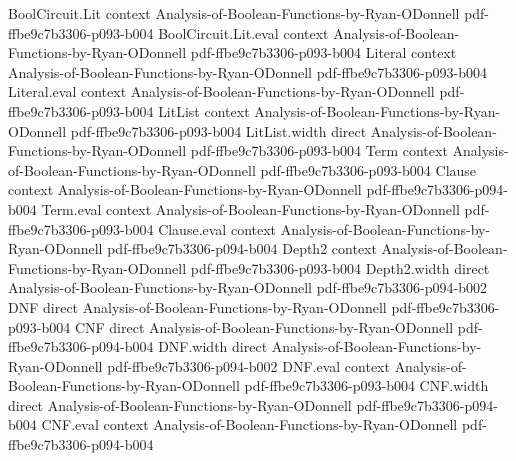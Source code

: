 \begin{lemma}
\label{BoolBLR.BLR_completeness}
\leanok
{}
\proofstep
  {BoolCircuit.Lit}
  {context}
  {Analysis-of-Boolean-Functions-by-Ryan-ODonnell}
  {pdf-ffbe9c7b3306-p093-b004}
\proofstep
  {BoolCircuit.Lit.eval}
  {context}
  {Analysis-of-Boolean-Functions-by-Ryan-ODonnell}
  {pdf-ffbe9c7b3306-p093-b004}
\proofstep
  {Literal}
  {context}
  {Analysis-of-Boolean-Functions-by-Ryan-ODonnell}
  {pdf-ffbe9c7b3306-p093-b004}
\proofstep
  {Literal.eval}
  {context}
  {Analysis-of-Boolean-Functions-by-Ryan-ODonnell}
  {pdf-ffbe9c7b3306-p093-b004}
\proofstep
  {LitList}
  {context}
  {Analysis-of-Boolean-Functions-by-Ryan-ODonnell}
  {pdf-ffbe9c7b3306-p093-b004}
\proofstep
  {LitList.width}
  {direct}
  {Analysis-of-Boolean-Functions-by-Ryan-ODonnell}
  {pdf-ffbe9c7b3306-p093-b004}
\proofstep
  {Term}
  {context}
  {Analysis-of-Boolean-Functions-by-Ryan-ODonnell}
  {pdf-ffbe9c7b3306-p093-b004}
\proofstep
  {Clause}
  {context}
  {Analysis-of-Boolean-Functions-by-Ryan-ODonnell}
  {pdf-ffbe9c7b3306-p094-b004}
\proofstep
  {Term.eval}
  {context}
  {Analysis-of-Boolean-Functions-by-Ryan-ODonnell}
  {pdf-ffbe9c7b3306-p093-b004}
\proofstep
  {Clause.eval}
  {context}
  {Analysis-of-Boolean-Functions-by-Ryan-ODonnell}
  {pdf-ffbe9c7b3306-p094-b004}
\proofstep
  {Depth2}
  {context}
  {Analysis-of-Boolean-Functions-by-Ryan-ODonnell}
  {pdf-ffbe9c7b3306-p093-b004}
\proofstep
  {Depth2.width}
  {direct}
  {Analysis-of-Boolean-Functions-by-Ryan-ODonnell}
  {pdf-ffbe9c7b3306-p094-b002}
\proofstep
  {DNF}
  {direct}
  {Analysis-of-Boolean-Functions-by-Ryan-ODonnell}
  {pdf-ffbe9c7b3306-p093-b004}
\proofstep
  {CNF}
  {direct}
  {Analysis-of-Boolean-Functions-by-Ryan-ODonnell}
  {pdf-ffbe9c7b3306-p094-b004}
\proofstep
  {DNF.width}
  {direct}
  {Analysis-of-Boolean-Functions-by-Ryan-ODonnell}
  {pdf-ffbe9c7b3306-p094-b002}
\proofstep
  {DNF.eval}
  {context}
  {Analysis-of-Boolean-Functions-by-Ryan-ODonnell}
  {pdf-ffbe9c7b3306-p093-b004}
\proofstep
  {CNF.width}
  {direct}
  {Analysis-of-Boolean-Functions-by-Ryan-ODonnell}
  {pdf-ffbe9c7b3306-p094-b004}
\proofstep
  {CNF.eval}
  {context}
  {Analysis-of-Boolean-Functions-by-Ryan-ODonnell}
  {pdf-ffbe9c7b3306-p094-b004}

\end{lemma}
